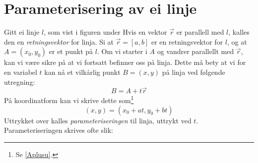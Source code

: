 \section{Parameterisering av ei linje}
Gitt ei linje $ l $, som vist i figuren under
Hvis en vektor $ \vec{r} $ er parallell med $ l $, kalles den en \textit{retningsvektor}  for linja. Si at $ {\vec{r}=[a, b]} $ er en retningsvektor for $ l $, og at $ A=(x_0, y_0) $ er et punkt på $ l $. Om vi starter i $ A $ og vandrer parallellt med $ \vec{r} $, kan vi være sikre på at vi fortsatt befinner oss på linja. Dette må bety at vi for en variabel $ t $ kan nå et vilkårlig punkt $ {B=(x, y)} $ på linja ved følgende utregning:
\[B= A+t\vec{r} \]
På koordinatform kan vi skrive dette som\footnote{Se \eqref{Aplusu}.}
\[(x, y)= (x_0 +at, y_0+bt) \]
Uttrykket over kalles \textit{parameteriseringen} til linja, uttrykt ved $ t $. Parameteriseringen skrives ofte slik:\regv
{}

